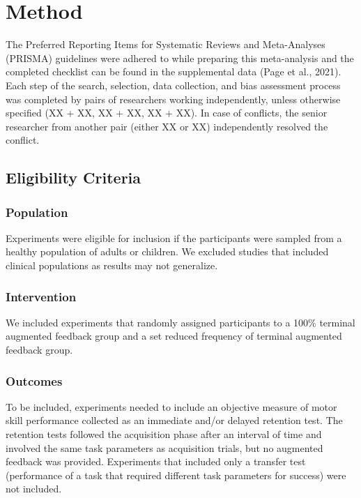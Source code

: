 \documentclass[
  english,
  man, donotrepeattitle,mask,floatsintext]{apa7}
\begin{document}
\hypertarget{method}{%
\section{Method}\label{method}}

The Preferred Reporting Items for Systematic Reviews and Meta-Analyses (PRISMA) guidelines were adhered to while preparing this meta-analysis and the completed checklist can be found in the supplemental data (Page et al., 2021). Each step of the search, selection, data collection, and bias assessment process was completed by pairs of researchers working independently, unless otherwise specified (XX + XX, XX + XX, XX + XX). In case of conflicts, the senior researcher from another pair (either XX or XX) independently resolved the conflict.

\hypertarget{eligibility-criteria}{%
\subsection{Eligibility Criteria}\label{eligibility-criteria}}

\hypertarget{population}{%
\subsubsection{Population}\label{population}}

Experiments were eligible for inclusion if the participants were sampled from a healthy population of adults or children. We excluded studies that included clinical populations as results may not generalize.

\hypertarget{intervention}{%
\subsubsection{Intervention}\label{intervention}}

We included experiments that randomly assigned participants to a 100\% terminal augmented feedback group and a set reduced frequency of terminal augmented feedback group.

\hypertarget{outcomes}{%
\subsubsection{Outcomes}\label{outcomes}}

To be included, experiments needed to include an objective measure of motor skill performance collected as an immediate and/or delayed retention test. The retention tests followed the acquisition phase after an interval of time and involved the same task parameters as acquisition trials, but no augmented feedback was provided. Experiments that included only a transfer test (performance of a task that required different task parameters for success) were not included.
\end{document}
